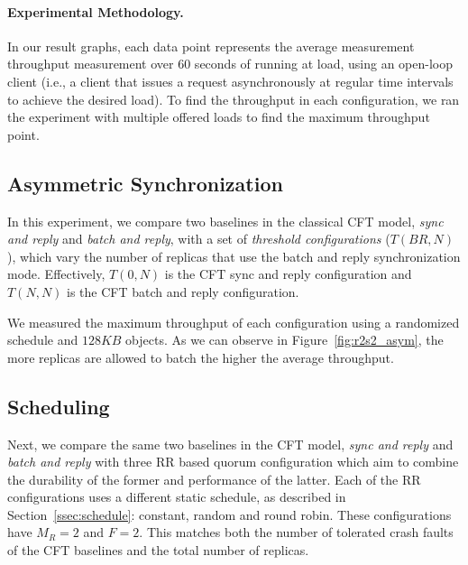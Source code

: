 \paragraph{Experimental Methodology.} In our result graphs, each data point represents the average
measurement throughput measurement over $60$ seconds of running
at load, using an open-loop client (i.e., a client that issues a
request asynchronously at regular time intervals to achieve the
desired load). To find the throughput in each configuration, we
ran the experiment with multiple offered loads to find the
maximum throughput point.


\subsection{Asymmetric
Synchronization}\label{ssec:r2s2_eval_asym}

In this experiment, we compare two baselines in the classical
\ac{CFT} model, \emph{sync and
reply} and \emph{batch and reply}, with a set of \emph{threshold
configurations} ($T(BR, N)$), which vary the number of replicas that use the
batch and reply synchronization mode. Effectively, $T(0, N)$ is
the \ac{CFT} sync and reply configuration and $T(N, N)$ is the
\ac{CFT} batch and reply configuration.

We measured the maximum throughput of each configuration using a
randomized schedule and $128KB$ objects. As we can observe in
Figure~\ref{fig:r2s2_asym}, the more replicas are
allowed to batch the higher the average throughput.


\subsection{Scheduling}\label{ssec:r2s2_eval_scheduling}


Next, we compare the same two baselines in the
\ac{CFT} model, \emph{sync and
reply} and \emph{batch and reply} with three \ac{RR} based quorum
configuration which aim to combine the durability of the former and
performance of the latter. Each of the \ac{RR} configurations
uses a different static schedule, as described in
Section~\ref{ssec:schedule}: constant, random and round robin.
These configurations have $M_R = 2$ and $F = 2$. This matches
both the number of tolerated crash faults of the \ac{CFT}
baselines and the total number of replicas.


